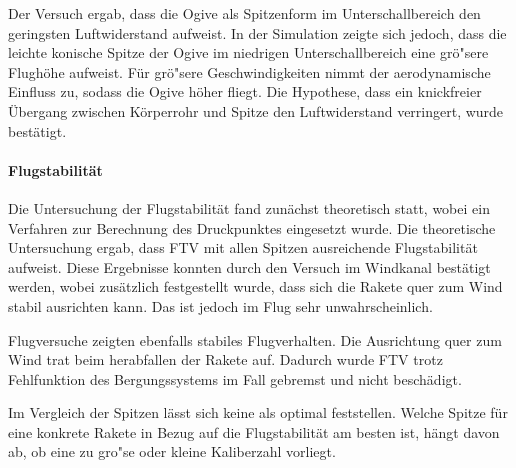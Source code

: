 \documentclass[11pt,a4paper]{article}
\begin{document}
Der Versuch ergab, dass die Ogive als Spitzenform im Unterschallbereich den geringsten Luftwiderstand aufweist. In der Simulation zeigte sich jedoch, dass die leichte konische Spitze der Ogive im niedrigen Unterschallbereich eine grö"sere Flughöhe aufweist. Für grö"sere Geschwindigkeiten nimmt der aerodynamische Einfluss zu, sodass die Ogive höher fliegt. Die Hypothese, dass ein knickfreier Übergang zwischen Körperrohr und Spitze den Luftwiderstand verringert, wurde bestätigt.

\vspace{-10pt}
\paragraph{Flugstabilität}
Die Untersuchung der Flugstabilität fand zunächst theoretisch statt, wobei ein Verfahren zur Berechnung des Druckpunktes eingesetzt wurde.
Die theoretische Untersuchung ergab, dass FTV mit allen Spitzen ausreichende Flugstabilität aufweist. Diese Ergebnisse konnten durch den Versuch im Windkanal bestätigt werden, wobei zusätzlich festgestellt wurde, dass sich die Rakete quer zum Wind stabil ausrichten kann. Das ist jedoch im Flug sehr unwahrscheinlich.

Flugversuche zeigten ebenfalls stabiles Flugverhalten. Die Ausrichtung quer zum Wind trat beim herabfallen der Rakete auf. Dadurch wurde FTV trotz Fehlfunktion des Bergungssystems im Fall gebremst und nicht beschädigt.

Im Vergleich der Spitzen lässt sich keine als optimal feststellen. Welche Spitze für eine konkrete Rakete in Bezug auf die Flugstabilität am besten ist, hängt davon ab, ob eine zu gro"se oder kleine Kaliberzahl vorliegt.
\end{document}
